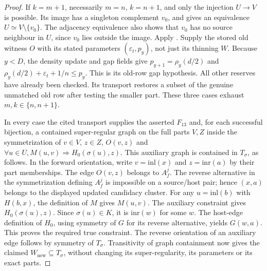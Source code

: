 \begin{proof}
If $k=m+1$, necessarily $m=n$, $k=n+1$, and only the injection
$U\to V$ is possible. Its image has a singleton complement $v_0$,
and gives an equivalence $U\simeq V\setminus\{v_0\}$.
The adjacency equivalence also shows that $v_0$ has no source neighbour
in $U$, since $v_0$ lies outside the image.
Apply . Supply the stored
old witness $O$ with its stated parameters
$(\varepsilon_t,p_y)$, not just its thinning $W$.
Because $y<D$, the density update and gap fields give
$p_{y+1}=\rho_y(d/2)$ and
$\rho_y(d/2)+\varepsilon_t+1/n\le p_y$.
This is its old-row gap hypothesis. All other reserves have already
been checked. Its transport restores a subset of the genuine unmatched
old row after testing the smaller part.
These three cases exhaust $m,k\in\{n,n+1\}$.

In every case the cited transport supplies the asserted $F_{13}$ and,
for each successful bijection, a contained super-regular graph on the
full parts $V,Z$ inside the symmetrization of
$v\in V$, $z\in Z$, $O(v,z)$ and
$\forall u\in U, M(u,v)\Rightarrow H_0(\sigma(u),z)$.
This auxiliary graph is contained in $T_\sigma$, as follows.
In the forward orientation, write $v=\mathrm{inl}(x)$ and
$z=\mathrm{inr}(a)$ by their part memberships.
The edge $O(v,z)$ belongs to $A_f^j$. The reverse alternative in the
symmetrization defining $A_f^j$ is impossible on a source/host pair;
hence $(x,a)$ belongs to the displayed updated candidacy cluster.
For any $u=\mathrm{inl}(b)$ with $H(b,x)$, the definition of $M$
gives $M(u,v)$. The auxiliary constraint gives
$H_0(\sigma(u),z)$. Since $\sigma(u)\in K$, it is
$\mathrm{inr}(w)$ for some $w$. The host-edge definition of $H_0$,
using symmetry of $G$ for its reverse alternative, yields $G(w,a)$.
This proves the required true constraint. The reverse orientation of
an auxiliary edge follows by symmetry of $T_\sigma$.
Transitivity of graph containment now gives the claimed
$W_{\mathrm{new}}\subseteq T_\sigma$, without changing its
super-regularity, its parameters or its exact parts.
\end{proof}
